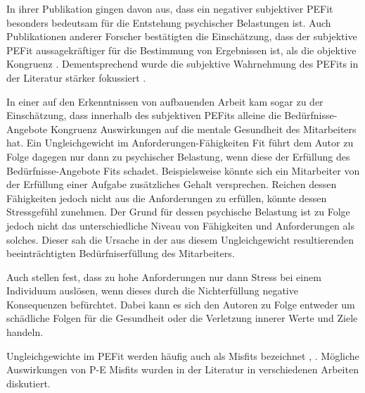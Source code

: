 In ihrer Publikation gingen \textcite[S. 4]{copingAndAdaption:1974} davon aus, dass ein negativer subjektiver \ac{PEFit} besonders bedeutsam für die Entstehung psychischer Belastungen ist. Auch Publikationen anderer Forscher bestätigten die Einschätzung, dass der subjektive \ac{PEFit} aussagekräftiger für die Bestimmung von Ergebnissen ist, als die objektive Kongruenz \cite[S. 3]{carless:2005}. Dementsprechend wurde die subjektive Wahrnehmung des \acp{PEFit} in der Literatur stärker fokussiert \cite[S. 8]{caplan:1987}\cite[S. 9]{caplan:1993}\cite[S. 16]{choi:2004}.

In einer auf den Erkenntnissen von \textcite[S. 1ff.]{copingAndAdaption:1974} aufbauenden Arbeit kam \textcite[S. 5ff.]{harrison:1978} sogar zu der Einschätzung, dass innerhalb des subjektiven \acp{PEFit} alleine die Bedürfnisse-Angebote Kongruenz Auswirkungen auf die mentale Gesundheit des Mitarbeiters hat. Ein Ungleichgewicht im Anforderungen-Fähigkeiten Fit führt dem Autor zu Folge dagegen nur dann zu psychischer Belastung, wenn diese der Erfüllung des Bedürfnisse-Angebote Fits schadet. Beispielsweise könnte sich ein Mitarbeiter von der Erfüllung einer Aufgabe zusätzliches Gehalt versprechen. Reichen dessen Fähigkeiten jedoch nicht aus die Anforderungen zu erfüllen, könnte dessen Stressgefühl zunehmen. Der Grund für dessen psychische Belastung ist \textcite[S. 13]{harrison:1978} zu Folge jedoch nicht das unterschiedliche Niveau von Fähigkeiten und Anforderungen als solches. Dieser sah die Ursache in der aus diesem Ungleichgewicht resultierenden beeinträchtigten Bedürfniserfüllung des Mitarbeiters.

Auch \textcite[S. 1ff.]{lazarus:1978} stellen fest, dass zu hohe Anforderungen nur dann Stress bei einem Individuum auslösen, wenn dieses durch die Nichterfüllung negative Konsequenzen befürchtet. Dabei kann es sich den Autoren zu Folge entweder um schädliche Folgen für die Gesundheit oder die Verletzung innerer Werte und Ziele handeln.

Ungleichgewichte im \ac{PEFit} werden häufig auch als Misfits bezeichnet \cite[S. 2]{edwards:2004}, \cite[S. 4]{kristof:1996}. Mögliche Auswirkungen von P-E Misfits wurden in der Literatur in verschiedenen Arbeiten diskutiert.

